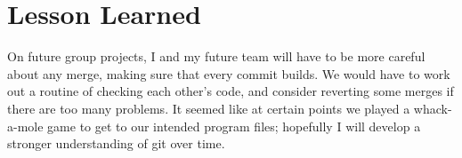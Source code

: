 \documentclass{article}
\begin{document}
\section{Lesson Learned}
On future group projects, I and my future team will have to be more careful about any merge, making sure that every commit builds. We would have to work out a routine of checking each other's code, and consider reverting some merges if there are too many problems. It seemed like at certain points we played a whack-a-mole game to get to our intended program files; hopefully I will develop a stronger understanding of git over time.
\end{document}
